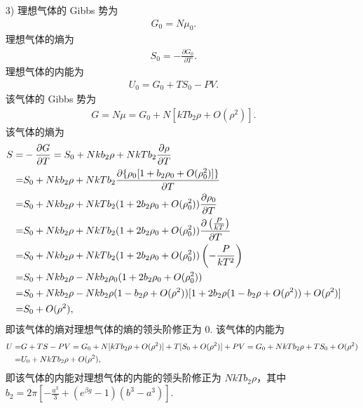 \documentclass{assignment}
\begin{document}
\begin{sol}
\begin{itemize}
        \item[3)] 理想气体的 Gibbs 势为
        \begin{align}
            G_0=N\mu_0.
        \end{align}
        理想气体的熵为
        \begin{align}
            S_0=-\frac{\partial G_0}{\partial T}.
        \end{align}
        理想气体的内能为
        \begin{align}
            U_0=G_0+TS_0-PV.
        \end{align}
        该气体的 Gibbs 势为
        \begin{align}
            G=N\mu=G_0+N[kTb_2\rho+O(\rho^2)].
        \end{align}
        该气体的熵为
        \begin{align}
            \notag S=&-\frac{\partial G}{\partial T}=S_0+Nkb_2\rho+NkTb_2\frac{\partial\rho}{\partial T}\\
            \notag=&S_0+Nkb_2\rho+NkTb_2\frac{\partial\{\rho_0[1+b_2\rho_0+O(\rho_0^2)]\}}{\partial T}\\
            \notag=&S_0+Nkb_2\rho+NkTb_2(1+2b_2\rho_0+O(\rho_0^2))\frac{\partial\rho_0}{\partial T}\\
            \notag=&S_0+Nkb_2\rho+NkTb_2(1+2b_2\rho_0+O(\rho_0^2))\frac{\partial\left(\frac{P}{kT}\right)}{\partial T}\\
            \notag=&S_0+Nkb_2\rho+NkTb_2(1+2b_2\rho_0+O(\rho_0^2))\left(-\frac{P}{kT^2}\right)\\
            \notag=&S_0+Nkb_2\rho-Nkb_2\rho_0(1+2b_2\rho_0+O(\rho_0^2))\\
            \notag=&S_0+Nkb_2\rho-Nkb_2\rho(1-b_2\rho+O(\rho^2))[1+2b_2\rho(1-b_2\rho+O(\rho^2))+O(\rho^2)]\\
            \notag=&S_0+O(\rho^2),
        \end{align}
        即该气体的熵对理想气体的熵的领头阶修正为 \uline{$0$}.
        该气体的内能为
        \begin{align}
            \notag U=&G+TS-PV=G_0+N[kTb_2\rho+O(\rho^2)]+T[S_0+O(\rho^2)]+PV=G_0+NkTb_2\rho+TS_0+O(\rho^2)\\
            =&U_0+NkTb_2\rho+O(\rho^2),
        \end{align}
        即该气体的内能对理想气体的内能的领头阶修正为 \uline{$NkTb_2\rho$}，其中 $b_2=2\pi\left[-\frac{a^3}{3}+(e^{\beta g}-1)(b^3-a^3)\right]$.
    \end{itemize}
\end{sol}
\clearpage
\end{document}
